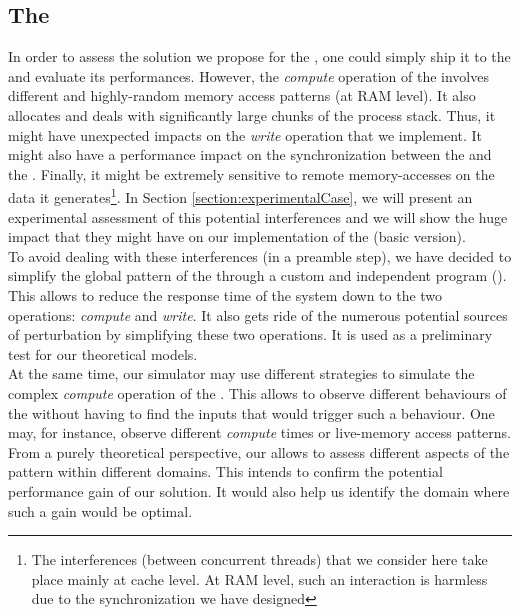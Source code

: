 	\subsection{The \toolSimulationSoftware} \label{subsection:simulationTestbed}
		In order to assess the solution we propose for the \toolTargetSoftware, one could simply ship it to the \toolTargetSoftware\space and evaluate its performances.   However, the \emph{compute} operation of the \toolTargetSoftware\space involves different and highly-random memory access patterns (at RAM level).   It also allocates and deals with significantly large chunks of the process stack.   Thus, it might have unexpected impacts on the \emph{write} operation that we implement.   It might also have a performance impact on the synchronization between the \notationaioComputeThread\space and the \notationaioWriteThreads.   Finally, it might be extremely sensitive to remote memory-accesses on the data it generates\footnote{The interferences (between concurrent threads) that we consider here take place mainly at cache level.   At RAM level, such an interaction is harmless due to the synchronization we have designed}.   In Section \ref{section:experimentalCase}, we will present an experimental assessment of this potential interferences and we will show the huge impact that they might have on our implementation of the \toolTargetSoftware\space (basic version).\\

		To avoid dealing with these interferences (in a preamble step), we have decided to simplify the global pattern of the \toolTargetSoftware\space through a custom and independent program (\toolSimulationSoftware).   This \toolSimulationSoftware\space allows to reduce the response time of the system down to the two operations: \emph{compute} and \emph{write}.   It also gets ride of the numerous potential sources of perturbation by simplifying these two operations.   It is used as a preliminary test for our theoretical models.\\
		At the same time, our simulator may use different strategies to simulate the complex \emph{compute} operation of the \toolTargetSoftware.   This allows to observe different behaviours of the \toolTargetSoftware\space without having to find the inputs that would trigger such a behaviour.   One may, for instance, observe different \emph{compute} times or live-memory access patterns.   From a purely theoretical perspective, our \toolSimulationSoftware\space allows to assess different aspects of the \toolTargetSoftware\space pattern within different domains.   This intends to confirm the potential performance gain of our solution.   It would also help us identify the domain where such a gain would be optimal.\\


